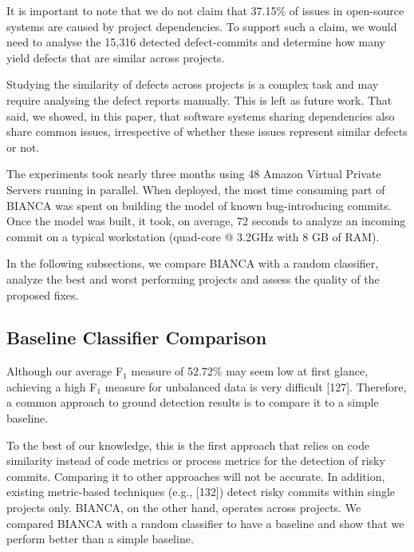 \documentclass[12pt]{report}
\begin{document}
It is important to note that we do not claim that 37.15\% of issues in
open-source systems are caused by project dependencies. To support such
a claim, we would need to analyse the 15,316 detected defect-commits and
determine how many yield defects that are similar across projects.

Studying the similarity of defects across projects is a complex task and
may require analysing the defect reports manually. This is left as
future work. That said, we showed, in this paper, that software systems
sharing dependencies also share common issues, irrespective of whether
these issues represent similar defects or not.

The experiments took nearly three months using 48 Amazon Virtual Private
Servers running in parallel. When deployed, the most time consuming part
of BIANCA was spent on building the model of known bug-introducing
commits. Once the model was built, it took, on average, 72 seconds to
analyze an incoming commit on a typical workstation (quad-core @ 3.2GHz
with 8 GB of RAM).

In the following subsections, we compare BIANCA with a random
classifier, analyze the best and worst performing projects and assess
the quality of the proposed fixes.

\subsection{Baseline Classifier
Comparison}\label{baseline-classifier-comparison}

Although our average F\(_1\) measure of 52.72\% may seem low at first
glance, achieving a high F\(_1\) measure for unbalanced data is very
difficult {[}127{]}. Therefore, a common approach to ground detection
results is to compare it to a simple baseline.

To the best of our knowledge, this is the first approach that relies on
code similarity instead of code metrics or process metrics for the
detection of risky commits. Comparing it to other approaches will not be
accurate. In addition, existing metric-based techniques (e.g.,
{[}132{]}) detect risky commits within single projects only. BIANCA, on
the other hand, operates across projects. We compared BIANCA with a
random classifier to have a baseline and show that we perform better
than a simple baseline.
\end{document}
